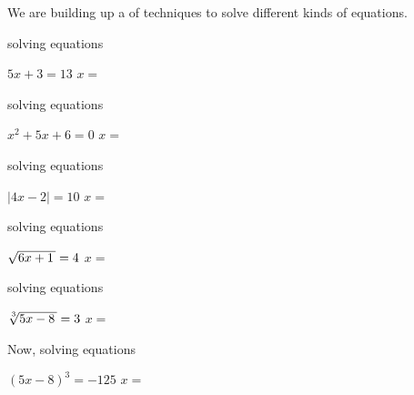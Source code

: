 \vfill 
We are building up a  of techniques to solve different kinds of equations.
\vspace{1\onelineskip}

\begin{tcbraster}[
    raster equal height, 
    raster columns = 2,
    raster column skip = 0.5in,
]
    \begin{tcolorbox}[colback=white,boxrule=0.5pt,]
        \raggedright
        {\small solving  equations \phantom{xxxxxxx}}
        \begin{center}
            \small
            $5x +3 = 13$
            \quad{\large$\Rightarrow$}\quad
            $x =$ 
        \end{center}
    \end{tcolorbox}
    \begin{tcolorbox}[colback=white,boxrule=0.5pt,]
        \raggedright
        {\small solving  equations}
        \begin{center}
            \small
            $x^2 + 5x + 6 = 0$
            \quad{\large$\Rightarrow$}\quad
            $x =$ 
        \end{center}
    \end{tcolorbox}
    \begin{tcolorbox}[colback=white,boxrule=0.5pt,]
        \raggedright
        {\small solving  equations}
        \begin{center}
            \small
            $|4x -2 | = 10$
            \quad{\large$\Rightarrow$}\quad
            $x =$ 
        \end{center}
    \end{tcolorbox}
    \begin{tcolorbox}[colback=white,boxrule=0.5pt,]
        \raggedright
        {\small solving  equations}
        \begin{center}
            \small
            $\myRoot{6x+1} = 4$
            \quad{\large$\Rightarrow$}\quad
            $x =$ 
        \end{center}
    \end{tcolorbox}
    \begin{tcolorbox}[colback=white,boxrule=0.5pt,]
        \raggedright
        {\small solving  equations}
        \begin{center}
            \small
            $\myRoot[3]{5x-8} = 3$
            \quad{\large$\Rightarrow$}\quad
            $x =$ 
        \end{center}
    \end{tcolorbox}
    \begin{tcolorbox}[colback=white,boxrule=0.5pt,]
        \raggedright
        {\small Now, solving  equations}
        \begin{center}
            \small
            $(5x-8)^3 = -125$
            \quad{\large$\Rightarrow$}\quad
            $x =$ 
        \end{center}
    \end{tcolorbox}
\end{tcbraster}
